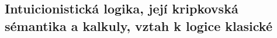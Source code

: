 

\subsection{Intuicionistická logika, její kripkovská sémantika a kalkuly, vztah k logice klasické}

